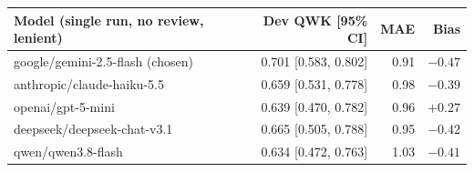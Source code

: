 \begin{tabular}{lrrr}
\toprule
Model (single run, no review, lenient) & Dev QWK [95\% CI] & MAE & Bias \\
\midrule
google/gemini-2.5-flash (chosen) & 0.701 [0.583, 0.802] & 0.91 & $-0.47$ \\
anthropic/claude-haiku-5.5 & 0.659 [0.531, 0.778] & 0.98 & $-0.39$ \\
openai/gpt-5-mini & 0.639 [0.470, 0.782] & 0.96 & $+0.27$ \\
deepseek/deepseek-chat-v3.1 & 0.665 [0.505, 0.788] & 0.95 & $-0.42$ \\
qwen/qwen3.8-flash & 0.634 [0.472, 0.763] & 1.03 & $-0.41$ \\
\bottomrule
\end{tabular}
